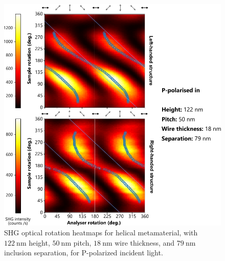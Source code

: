 \begin{figure}[htb!]	
    \centering	
    \includegraphics[scale=1]{./figures/results/OAinPlanarNanohelices/8_p_data.pdf}

    \caption{\label{fig:results:OAinPlanarNanohelices:8_p_data}
    SHG optical rotation heatmaps for helical metamaterial, with $\SI{122}{\nano\m}$ height, $\SI{50}{\nano\m}$ pitch, $\SI{18}{\nano\m}$ wire thickness, and $\SI{79}{\nano\m}$ inclusion separation, for P-polarized incident light.}	
\end{figure}